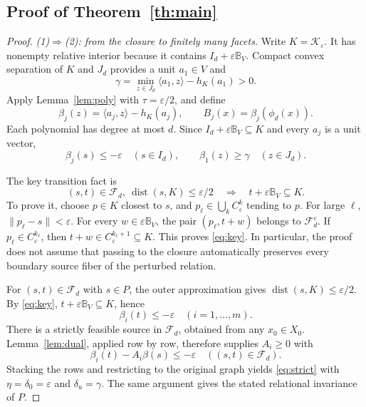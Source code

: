 \documentclass[journal,10pt]{IEEEtran}
\theoremstyle{definition}\newtheorem{definition}{Definition}
\theoremstyle{remark}
\newcommand{\dist}{\operatorname{dist}}
\newcommand{\ball}{\mathbb B_V}
\newcommand{\F}{\mathcal F_d}
\begin{document}
\subsection{Proof of Theorem~\ref{th:main}}
\begin{proof}
\emph{(1)$\Rightarrow$(2): from the closure to finitely many facets.}
Write $K=\mathcal K_\varepsilon$. It has nonempty relative interior because it contains $I_d+\varepsilon\ball$. Compact convex separation of $K$ and $J_d$ provides a unit $a_1\in V$ and
\begin{equation}\label{eq:anchor}
 \gamma=\min_{z\in J_d}\langle a_1,z\rangle-h_K(a_1)>0.
\end{equation}
Apply Lemma~\ref{lem:poly} with $\tau=\varepsilon/2$, and define
\[
 \beta_j(z)=\langle a_j,z\rangle-h_K(a_j),\qquad
 B_j(x)=\beta_j(\phi_d(x)).
\]
Each polynomial has degree at most $d$. Since $I_d+\varepsilon\ball\subseteq K$ and every $a_j$ is a unit vector,
\[
 \beta_j(s)\leq-\varepsilon\quad(s\in I_d),\qquad
 \beta_1(z)\geq\gamma\quad(z\in J_d).
\]

The key transition fact is
\begin{equation}\label{eq:key}
 (s,t)\in\F,\ \dist(s,K)\leq\varepsilon/2
 \quad\Longrightarrow\quad t+\varepsilon\ball\subseteq K.
\end{equation}
To prove it, choose $p\in K$ closest to $s$, and $p_\ell\in\bigcup_k C_\varepsilon^k$ tending to $p$. For large $\ell$, $\|p_\ell-s\|<\varepsilon$. For every $w\in\varepsilon\ball$, the pair $(p_\ell,t+w)$ belongs to $\mathcal F_d^\varepsilon$. If $p_\ell\in C_\varepsilon^{k_\ell}$, then $t+w\in C_\varepsilon^{k_\ell+1}\subseteq K$. This proves \eqref{eq:key}. In particular, the proof does not assume that passing to the closure automatically preserves every boundary source fiber of the perturbed relation.

For $(s,t)\in\F$ with $s\in P$, the outer approximation gives $\dist(s,K)\leq\varepsilon/2$. By \eqref{eq:key}, $t+\varepsilon\ball\subseteq K$, hence
\[
 \beta_i(t)\leq-\varepsilon\quad(i=1,\ldots,m).
\]
There is a strictly feasible source in $\F$, obtained from any $x_0\in X_0$. Lemma~\ref{lem:dual}, applied row by row, therefore supplies $A_i\geq0$ with
\[
 \beta_i(t)-A_i\beta(s)\leq-\varepsilon\quad((s,t)\in\F).
\]
Stacking the rows and restricting to the original graph yields \eqref{eq:strict} with $\eta=\delta_0=\varepsilon$ and $\delta_u=\gamma$. The same argument gives the stated relational invariance of $P$.


\end{proof}
\end{document}
